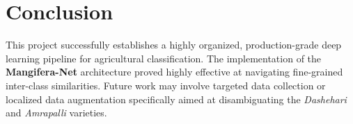\documentclass[12pt,a4paper]{article}
\begin{document}
\section{Conclusion}
This project successfully establishes a highly organized, production-grade deep learning pipeline for agricultural classification. The implementation of the \textbf{Mangifera-Net} architecture proved highly effective at navigating fine-grained inter-class similarities. Future work may involve targeted data collection or localized data augmentation specifically aimed at disambiguating the \textit{Dashehari} and \textit{Amrapalli} varieties.
\end{document}
